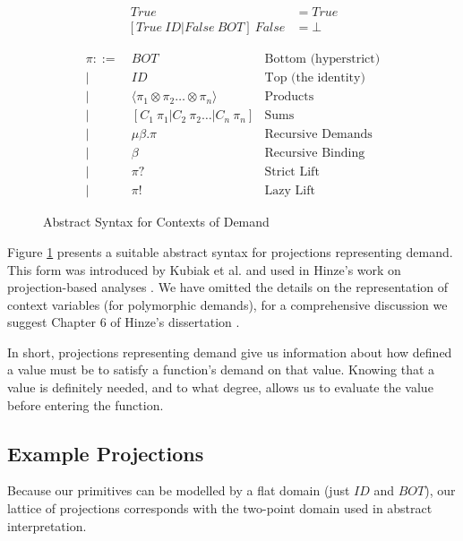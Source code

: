 \begin{align*}
[True\ ID | False\ ID]  \ True &= True \\
[True\ ID | False\ BOT] \ False &= \bot
\end{align*}

\begin{figure}
\begin{align*}
    \pi ::=&\ BOT              & \text{Bottom (hyperstrict)} \\
        |&\ ID               & \text{Top (the identity)} \\
        |&\ \langle \pi_{1} \otimes \pi_{2} \dots \otimes \pi_{n} \rangle   & \text{Products} \\ 
        |&\ [C_{1} \ \pi_{1} | C_{2} \ \pi_{2} \dots | C_{n} \ \pi_{n}]    & \text{Sums} \\ 
        |&\ \mu\beta . \pi     & \text{Recursive Demands} \\
        |&\ \beta              & \text{Recursive Binding} \\
        |&\ \pi?               & \text{Strict Lift} \\
        |&\ \pi!               & \text{Lazy Lift}
\end{align*}
\caption{Abstract Syntax for Contexts of Demand}
\label{fig:ContextAST}
\end{figure}


Figure \ref{fig:ContextAST}  presents a suitable abstract syntax for projections
representing demand.  This form was introduced by Kubiak et al. and used in
Hinze's work on projection-based analyses \citep{kubiak, hinze1995projection}.
We have omitted the details on the representation of context variables (for
polymorphic demands), for a comprehensive discussion we suggest Chapter 6 of Hinze's
dissertation \citep{hinze1995projection}.

In short, projections representing demand give us information about how defined
a value must be to satisfy a function's demand on that value. Knowing that a
value is definitely needed, and to what degree, allows us to evaluate the value
before entering the function.

\subsection*{Example Projections}

Because our primitives can be modelled by a flat domain (just $ID$ and $BOT$),
our lattice of projections corresponds with the two-point domain used in
abstract interpretation.

